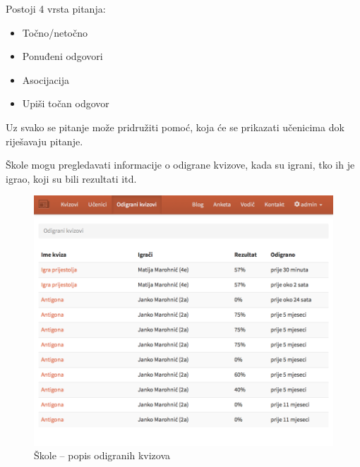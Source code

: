 \documentclass{scrreprt}
\begin{document}
Postoji 4 vrsta pitanja:

\begin{itemize}
  \item Točno/netočno
  \item Ponuđeni odgovori
  \item Asocijacija
  \item Upiši točan odgovor
\end{itemize}

Uz svako se pitanje može pridružiti pomoć, koja će se prikazati učenicima dok
riješavaju pitanje.

Škole mogu pregledavati informacije o odigrane kvizove, kada su igrani, tko ih
je igrao, koji su bili rezultati itd.

\begin{figure}[H]
  \includegraphics[width=\textwidth, clip=true, trim=0 10cm 0 0, fbox]{school/played_quizzes}
  \caption{Škole -- popis odigranih kvizova}
\end{figure}
\end{document}
